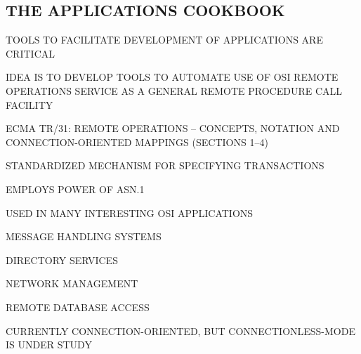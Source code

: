 \begin{bwslide}
\part*	{THE APPLICATIONS COOKBOOK}\bf

\begin{nrtc}
\item	TOOLS TO FACILITATE DEVELOPMENT OF APPLICATIONS ARE CRITICAL

\item	IDEA IS TO DEVELOP TOOLS TO AUTOMATE USE OF OSI REMOTE OPERATIONS
	SERVICE AS A GENERAL REMOTE PROCEDURE CALL FACILITY

\item	ECMA TR/31: REMOTE OPERATIONS -- CONCEPTS, NOTATION AND
	CONNECTION-ORIENTED MAPPINGS (SECTIONS 1--4)
\end{nrtc}
\end{bwslide}


\begin{bwslide}

\begin{nrtc}
\item	STANDARDIZED MECHANISM FOR SPECIFYING TRANSACTIONS

\item	EMPLOYS POWER OF ASN.1

\item	USED IN MANY INTERESTING OSI APPLICATIONS
    \begin{nrtc}
    \item	MESSAGE HANDLING SYSTEMS

    \item	DIRECTORY SERVICES

    \item	NETWORK MANAGEMENT

    \item	REMOTE DATABASE ACCESS
    \end{nrtc}

\item	CURRENTLY CONNECTION-ORIENTED, BUT CONNECTIONLESS-MODE IS UNDER STUDY
\end{nrtc}
\end{bwslide}

